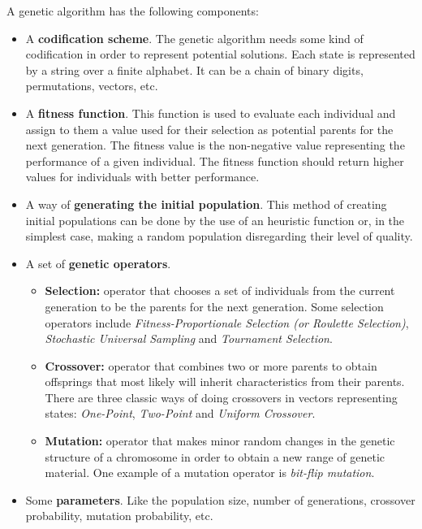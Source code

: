 \documentclass[]{llncs}
\begin{document}
A genetic algorithm has the following components:
\begin{itemize}
    \item A \textbf{codification scheme}. The genetic algorithm needs some kind of codification in order to represent potential solutions. Each state is represented by a string over a finite alphabet. It can be a chain of binary digits, permutations, vectors, etc. 
    \item A \textbf{fitness function}. This function is used to evaluate each individual and assign to them a value used for their selection as potential parents for the next generation. The fitness value is the non-negative value representing the performance of a given individual. The fitness function should return higher values for individuals with better performance.
    \item A way of \textbf{generating the initial population}. This method of creating initial populations can be done by the use of an heuristic function or, in the simplest case, making a random population disregarding their level of quality.
    \item A set of \textbf{genetic operators}. 
        \begin{itemize}
            \item \textbf{Selection:} operator that chooses a set of individuals from the current generation to be the parents for the next generation. Some selection operators include \textit{Fitness-Proportionale Selection (or Roulette Selection)}, \textit{Stochastic Universal Sampling} and \textit{Tournament Selection}.
            \item \textbf{Crossover:} operator that combines two or more parents to obtain offsprings that most likely will inherit characteristics from their parents. There are three classic ways of doing crossovers in vectors representing states: \textit{One-Point}, \textit{Two-Point} and \textit{Uniform Crossover}.
            \item \textbf{Mutation:} operator that makes minor random changes in the genetic structure of a chromosome in order to obtain a new range of genetic material. One example of a mutation operator is \textit{bit-flip mutation}.
        \end{itemize}
    \item Some \textbf{parameters}. Like the population size, number of generations, crossover probability, mutation probability, etc.
\end{itemize}
\end{document}
